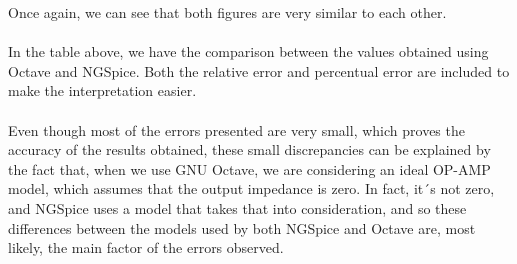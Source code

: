 Once again, we can see that both figures are very similar to each other.

\begin{center}
   \begin{table}[H]
\end{table}
\end{center}

\paragraph{}
In the table above, we have the comparison between the values obtained using Octave and NGSpice. Both the relative error and percentual error are included to make the interpretation easier. 

\paragraph{}
Even though most of the errors presented are very small, which proves the accuracy of the results obtained, these small discrepancies can be explained by the fact that, when we use GNU Octave, we are considering an ideal OP-AMP model, which assumes that the output impedance is zero. In fact, it´s not zero, and NGSpice uses a model that takes that into consideration, and so these differences between the models used by both NGSpice and Octave are, most likely, the main factor of the errors observed. 

